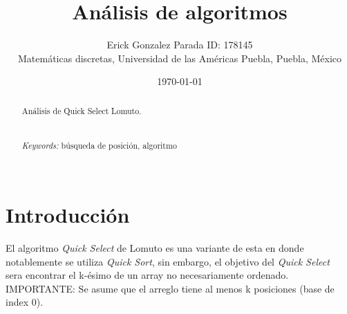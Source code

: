 \documentclass{article}
\begin{document}
\renewcommand{\footrulewidth}{1pt}
\renewcommand{\tablename}{Tabla}
\renewcommand{\figurename}{Figura}


\title{Análisis de algoritmos}
\author{\small{Erick Gonzalez Parada ID: 178145}\\
	   \small{Matemáticas discretas, Universidad de las Américas Puebla, Puebla, M\'exico}}
\date{\small{\today}}
\maketitle


\begin{abstract}
Análisis de Quick Select Lomuto.\\
\\
\\
{\it Keywords:}  búsqueda de posición, algoritmo   
\\
\\
\end{abstract}


\section{Introducción}\label{Introducción}                              	%
El algoritmo \textit{Quick Select} de Lomuto es una variante de esta en donde\\
notablemente se utiliza \textit{Quick Sort}, sin embargo, el objetivo del \textit{Quick Select}\\
sera encontrar el k-ésimo de un array no necesariamente ordenado.\\
IMPORTANTE: Se asume que el arreglo tiene al menos k posiciones (base de index 0).  
\end{document}
